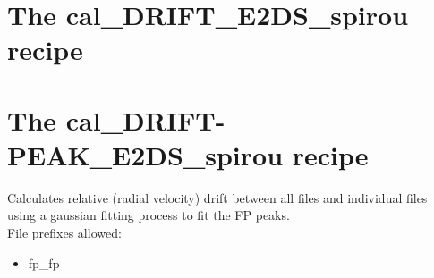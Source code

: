 

\clearpage
\newpage
\section{The cal\_DRIFT\_E2DS\_spirou recipe}
\label{section:cal_drift_e2ds}


\clearpage
\newpage
\section{The cal\_DRIFT-PEAK\_E2DS\_spirou recipe}
\label{section:cal_drift-peak_e2ds}

Calculates relative (radial velocity) drift between all files and individual files using a gaussian fitting process to fit the FP peaks. \\


\noindent File prefixes allowed:
\begin{itemize}
	\item fp\_fp
\end{itemize}

